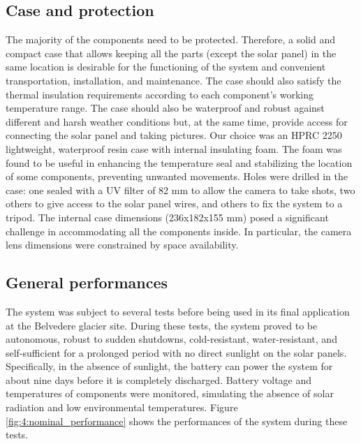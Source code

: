 \subsection{Case and protection}\label{Case and protection}
The majority of the components need to be protected. Therefore, a solid and compact case
that allows keeping all the parts (except the solar panel) in the same
location is desirable for the functioning of the system and convenient
transportation, installation, and maintenance. The case should also satisfy the thermal
insulation requirements according to each component's working temperature range. The case
should also be waterproof and robust against different and harsh weather conditions but, at the same time, provide access for connecting the solar panel and taking pictures. 
Our choice was an HPRC 2250 lightweight, waterproof resin case with internal insulating foam.
The foam was found to be useful in enhancing the temperature seal and stabilizing the location of some components, preventing unwanted movements. 
Holes were drilled in the case: one sealed with a UV filter of 82 mm to allow the camera to take shots, two others to give access to the solar panel wires, and others to fix the system to a tripod. 
The internal case dimensions (236x182x155 mm) posed a significant challenge in accommodating all the components inside. 
In particular, the camera lens dimensions were constrained by
space availability.

\subsection{General performances}\label{General_performances}
The system was subject to several tests before being used in its final application at the
Belvedere glacier site. During these tests, the system proved to be autonomous, robust to
sudden shutdowns, cold-resistant, water-resistant, and self-sufficient for a prolonged
period with no direct sunlight on the solar panels. 
Specifically, in the absence of sunlight, the battery can power the system for about nine days before it is completely discharged. 
Battery voltage and temperatures of components were monitored, simulating the absence of solar radiation and low environmental temperatures.
Figure \ref{fig:4:nominal_performance} shows the performances of the system during these tests.

